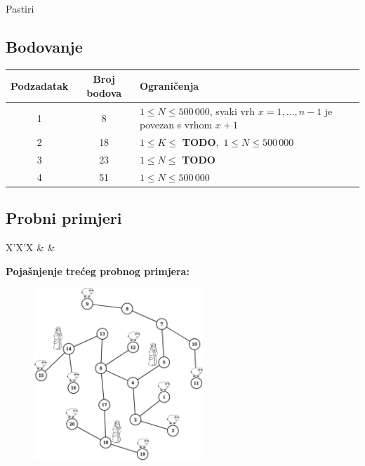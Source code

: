 \begin{statement}[
  problempoints=100,
  timelimit=1 sekunda,
  memorylimit=512 MiB,
]{Pastiri}
\subsection*{Bodovanje}
{\renewcommand{\arraystretch}{1.4}
  \setlength{\tabcolsep}{6pt}
  \begin{tabular}{ccl}
 Podzadatak & Broj bodova & Ograničenja \\ \midrule
  1 & 8 & $1 \le N \le 500\,000$, svaki vrh $x = 1, \dots, n-1$ je povezan s vrhom $x + 1$\\
  2 & 18 & $1 \le K \le $ \textbf{TODO}, $\, 1 \le N \le 500\,000$ \\
  3 & 23 & $1 \le N \le $ \textbf{TODO} \\
  4 & 51 & $1 \le N \le 500\,000$ \\
\end{tabular}}

\subsection*{Probni primjeri}
\begin{tabularx}{\textwidth}{X'X'X}
 &
 &
\end{tabularx}

\textbf{Pojašnjenje trećeg probnog primjera:}
\begin{figure}[H]
\centering
\includegraphics[width=0.57\textwidth]{img/pastiri_tp.png}
\end{figure}

\end{statement}


